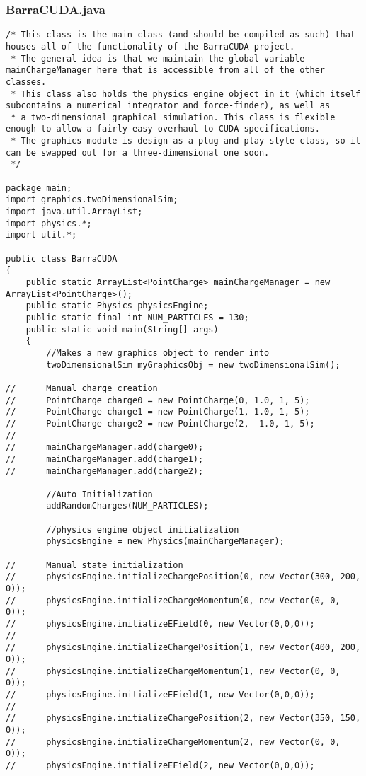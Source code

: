 \documentclass[10pt]{article}
\begin{document}
\subsubsection{BarraCUDA.java}
\begin{verbatim}
/* This class is the main class (and should be compiled as such) that houses all of the functionality of the BarraCUDA project.
 * The general idea is that we maintain the global variable mainChargeManager here that is accessible from all of the other classes.
 * This class also holds the physics engine object in it (which itself subcontains a numerical integrator and force-finder), as well as 
 * a two-dimensional graphical simulation. This class is flexible enough to allow a fairly easy overhaul to CUDA specifications.
 * The graphics module is design as a plug and play style class, so it can be swapped out for a three-dimensional one soon.
 */

package main;
import graphics.twoDimensionalSim;
import java.util.ArrayList;
import physics.*;
import util.*;

public class BarraCUDA 
{
	public static ArrayList<PointCharge> mainChargeManager = new ArrayList<PointCharge>();
	public static Physics physicsEngine;
	public static final int NUM_PARTICLES = 130;
	public static void main(String[] args)
	{
		//Makes a new graphics object to render into
		twoDimensionalSim myGraphicsObj = new twoDimensionalSim();
		
//		Manual charge creation
//		PointCharge charge0 = new PointCharge(0, 1.0, 1, 5);
//		PointCharge charge1 = new PointCharge(1, 1.0, 1, 5);
//		PointCharge charge2 = new PointCharge(2, -1.0, 1, 5);
//		
//		mainChargeManager.add(charge0);
//		mainChargeManager.add(charge1);
//		mainChargeManager.add(charge2);

		//Auto Initialization
		addRandomCharges(NUM_PARTICLES);
		
		//physics engine object initialization
		physicsEngine = new Physics(mainChargeManager);

//		Manual state initialization
//		physicsEngine.initializeChargePosition(0, new Vector(300, 200, 0));
//		physicsEngine.initializeChargeMomentum(0, new Vector(0, 0, 0));
//		physicsEngine.initializeEField(0, new Vector(0,0,0));
//
//		physicsEngine.initializeChargePosition(1, new Vector(400, 200, 0));
//		physicsEngine.initializeChargeMomentum(1, new Vector(0, 0, 0));
//		physicsEngine.initializeEField(1, new Vector(0,0,0));
//
//		physicsEngine.initializeChargePosition(2, new Vector(350, 150, 0));
//		physicsEngine.initializeChargeMomentum(2, new Vector(0, 0, 0));
//		physicsEngine.initializeEField(2, new Vector(0,0,0));
		

\end{verbatim}
\end{document}

